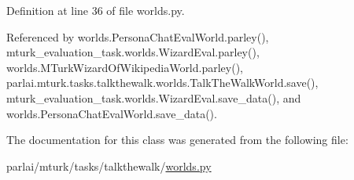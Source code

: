 Definition at line 36 of file worlds.\+py.



Referenced by worlds.\+Persona\+Chat\+Eval\+World.\+parley(), mturk\+\_\+evaluation\+\_\+task.\+worlds.\+Wizard\+Eval.\+parley(), worlds.\+M\+Turk\+Wizard\+Of\+Wikipedia\+World.\+parley(), parlai.\+mturk.\+tasks.\+talkthewalk.\+worlds.\+Talk\+The\+Walk\+World.\+save(), mturk\+\_\+evaluation\+\_\+task.\+worlds.\+Wizard\+Eval.\+save\+\_\+data(), and worlds.\+Persona\+Chat\+Eval\+World.\+save\+\_\+data().



The documentation for this class was generated from the following file\+:\begin{DoxyCompactItemize}
\item 
parlai/mturk/tasks/talkthewalk/\hyperlink{parlai_2mturk_2tasks_2talkthewalk_2worlds_8py}{worlds.\+py}\end{DoxyCompactItemize}
